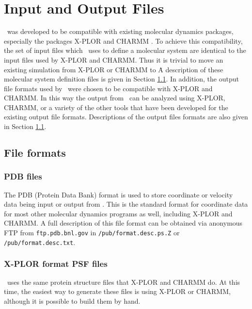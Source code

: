 
\section{Input and Output Files}
\label{section:files}

\NAMD\ was developed to be compatible with existing 
molecular dynamics packages, 
especially the packages X-PLOR 
and CHARMM .  
To achieve this compatibility,
the set of input files which \NAMD\ uses to define 
a molecular system are identical to the input files used by X-PLOR and CHARMM.  
Thus it is trivial to move an existing simulation from
X-PLOR or CHARMM to \NAMD\.
A description of these molecular system definition 
files is given in Section \ref{section:formats}.  
\prettypar
In addition, the output file formats used by \NAMD\ 
were chosen to be compatible with X-PLOR and CHARMM.  
In this way the output from \NAMD\ can be analyzed using
X-PLOR, CHARMM, or a variety of the other tools that have 
been developed for the existing output file formats.  
Descriptions of the output files formats are also given in 
Section \ref{section:formats}.


\subsection{File formats}
\label{section:formats}

\subsubsection{PDB files}
The PDB (Protein Data Bank) format is used to store coordinate or velocity data 
being input or output from \NAMD.
This is the standard format for coordinate data
for most other molecular dynamics programs as well, including X-PLOR and CHARMM.
A full description of this file format can be obtained via anonymous FTP from
\verb!ftp.pdb.bnl.gov! in \verb!/pub/format.desc.ps.Z! or \verb!/pub/format.desc.txt!.

\subsubsection{X-PLOR format PSF files}

\NAMD\ uses the same protein structure files that X-PLOR and CHARMM do.
At this time, the
easiest way to generate these files is using X-PLOR or CHARMM,
although it is possible to build them by hand.

